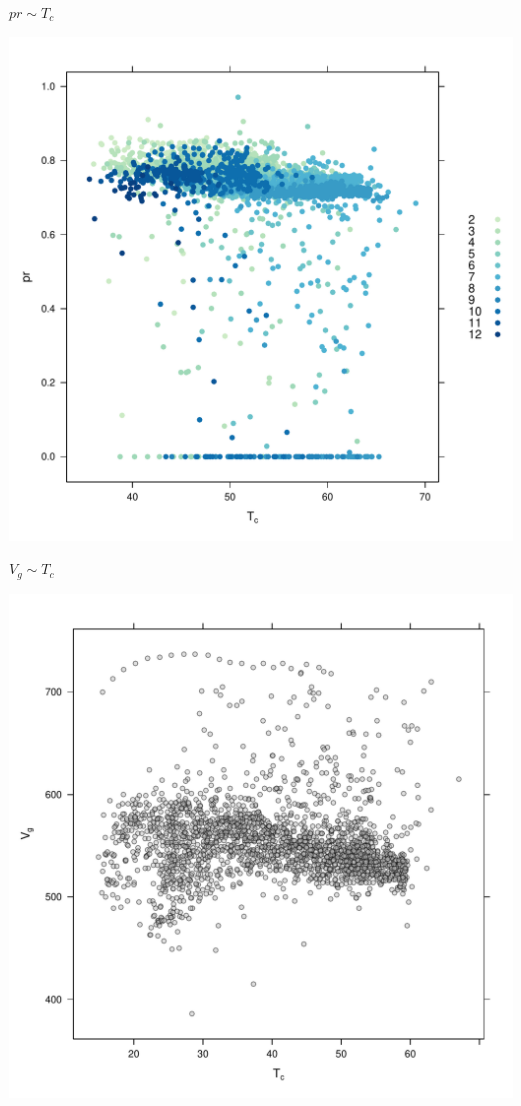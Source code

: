 \documentclass[aspectratio=169, usenames,svgnames,dvipsnames]{beamer}
\begin{document}
\begin{frame}[label={sec:org6f50382}]{\(pr \sim T_c\)}
\begin{center}
\includegraphics[height=0.95\textheight]{../figs/prTc.pdf}
\end{center}
\end{frame}

\begin{frame}[label={sec:org691aedd}]{\(V_g \sim T_c\)}
\begin{center}
\includegraphics[height=0.95\textheight]{../figs/VgTc.pdf}
\end{center}
\end{frame}
\end{document}

